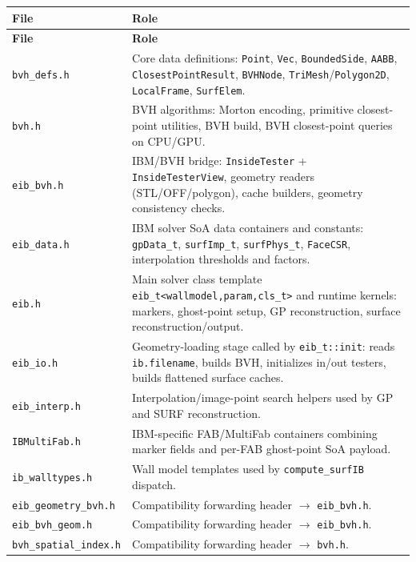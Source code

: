 \documentclass[11pt,a4paper]{article}
\begin{document}
\renewcommand{\arraystretch}{1.2}
\begin{longtable}{@{}L{3.5cm}L{10.5cm}@{}}
\toprule
\textbf{File} & \textbf{Role} \\
\midrule
\endfirsthead
\toprule
\textbf{File} & \textbf{Role} \\
\midrule
\endhead
\texttt{bvh\_defs.h}       & Core data definitions: \texttt{Point}, \texttt{Vec}, \texttt{BoundedSide}, \texttt{AABB}, \texttt{ClosestPointResult}, \texttt{BVHNode}, \texttt{TriMesh}/\texttt{Polygon2D}, \texttt{LocalFrame}, \texttt{SurfElem}. \\
\texttt{bvh.h}              & BVH algorithms: Morton encoding, primitive closest-point utilities, BVH build, BVH closest-point queries on CPU/GPU. \\
\texttt{eib\_bvh.h}         & IBM/BVH bridge: \texttt{InsideTester} + \texttt{InsideTesterView}, geometry readers (STL/OFF/polygon), cache builders, geometry consistency checks. \\
\texttt{eib\_data.h}        & IBM solver SoA data containers and constants: \texttt{gpData\_t}, \texttt{surfImp\_t}, \texttt{surfPhys\_t}, \texttt{FaceCSR}, interpolation thresholds and factors. \\
\texttt{eib.h}              & Main solver class template \texttt{eib\_t<wallmodel,param,cls\_t>} and runtime kernels: markers, ghost-point setup, GP reconstruction, surface reconstruction/output. \\
\texttt{eib\_io.h}          & Geometry-loading stage called by \texttt{eib\_t::init}: reads \texttt{ib.filename}, builds BVH, initializes in/out testers, builds flattened surface caches. \\
\texttt{eib\_interp.h}      & Interpolation/image-point search helpers used by GP and SURF reconstruction. \\
\texttt{IBMultiFab.h}       & IBM-specific FAB/MultiFab containers combining marker fields and per-FAB ghost-point SoA payload. \\
\texttt{ib\_walltypes.h}    & Wall model templates used by \texttt{compute\_surfIB} dispatch. \\
\texttt{eib\_geometry\_bvh.h} & Compatibility forwarding header $\to$ \texttt{eib\_bvh.h}. \\
\texttt{eib\_bvh\_geom.h}   & Compatibility forwarding header $\to$ \texttt{eib\_bvh.h}. \\
\texttt{bvh\_spatial\_index.h} & Compatibility forwarding header $\to$ \texttt{bvh.h}. \\
\bottomrule
\end{longtable}
\end{document}
